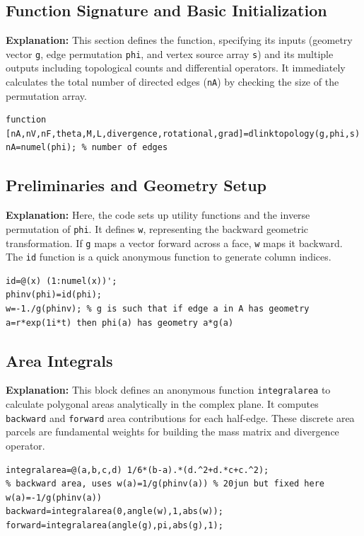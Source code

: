 \subsection{Function Signature and Basic Initialization}
\textbf{Explanation:} This section defines the function, specifying its inputs (geometry vector \texttt{g}, edge permutation \texttt{phi}, and vertex source array \texttt{s}) and its multiple outputs including topological counts and differential operators. It immediately calculates the total number of directed edges (\texttt{nA}) by checking the size of the permutation array.

\begin{lstlisting}[style=matlab]
function [nA,nV,nF,theta,M,L,divergence,rotational,grad]=dlinktopology(g,phi,s)
nA=numel(phi); % number of edges
\end{lstlisting}

\subsection{Preliminaries and Geometry Setup}
\textbf{Explanation:} Here, the code sets up utility functions and the inverse permutation of \texttt{phi}. It defines \texttt{w}, representing the backward geometric transformation. If \texttt{g} maps a vector forward across a face, \texttt{w} maps it backward. The \texttt{id} function is a quick anonymous function to generate column indices.

\begin{lstlisting}[style=matlab]
% preliminaries
id=@(x) (1:numel(x))';
phinv(phi)=id(phi);
w=-1./g(phinv); % g is such that if edge a in A has geometry a=r*exp(1i*t) then phi(a) has geometry a*g(a)
\end{lstlisting}

\subsection{Area Integrals}
\textbf{Explanation:} This block defines an anonymous function \texttt{integralarea} to calculate polygonal areas analytically in the complex plane. It computes \texttt{backward} and \texttt{forward} area contributions for each half-edge. These discrete area parcels are fundamental weights for building the mass matrix and divergence operator.

\begin{lstlisting}[style=matlab]
integralarea=@(a,b,c,d) 1/6*(b-a).*(d.^2+d.*c+c.^2);
% backward area, uses w(a)=1/g(phinv(a)) % 20jun but fixed here w(a)=-1/g(phinv(a))
backward=integralarea(0,angle(w),1,abs(w));
forward=integralarea(angle(g),pi,abs(g),1);
\end{lstlisting}

